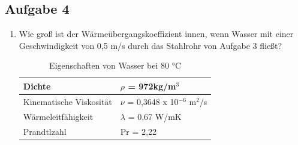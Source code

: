 \documentclass[a4paper,11pt]{article}
\numberwithin{equation}{section}
\begin{document}
\subsection*{Aufgabe 4}
\begin{enumerate}[label=\alph*)]
\item Wie groß ist der Wärmeübergangskoeffizient innen, wenn Wasser mit einer
Geschwindigkeit von 0,5 m/s durch das Stahlrohr von Aufgabe 3 fließt?

\begin{table}[h]
\centering
\caption{Eigenschaften von Wasser bei 80 °C}
\begin{tabular}{l|l}\rowcolor{miugray!50}
Dichte & $\rho$ = 972kg/m$^3$ \\ \hline
Kinematische Viskosität & $\nu$  = 0,3648 x 10$^{-6}$ m$^{2}$/s \\ \hline
Wärmeleitfähigkeit & $\lambda$ = 0,67 W/mK \\ \hline
Prandtlzahl & Pr = 2,22  \\ \hline
\end{tabular}
\end{table}


\end{enumerate}
\end{document}
